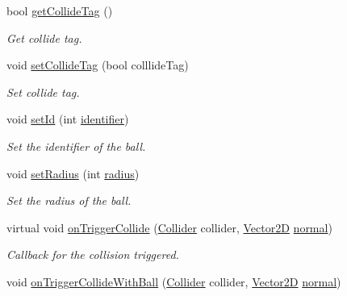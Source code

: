 \begin{DoxyCompactItemize}
\mbox{\label{class_ball_a553ca162341d99cec726faf101ebda15}} 
bool \mbox{\hyperlink{class_ball_a553ca162341d99cec726faf101ebda15}{get\+Collide\+Tag}} ()
\begin{DoxyCompactList}\small\item\em Get collide tag. \end{DoxyCompactList}\item 
\mbox{\label{class_ball_ac632803a5c106b3b0b4c79a1ca090c93}} 
void \mbox{\hyperlink{class_ball_ac632803a5c106b3b0b4c79a1ca090c93}{set\+Collide\+Tag}} (bool colllide\+Tag)
\begin{DoxyCompactList}\small\item\em Set collide tag. \end{DoxyCompactList}\item 
\mbox{\label{class_ball_ac2c10315d996774fc363d30b3fcae373}} 
void \mbox{\hyperlink{class_ball_ac2c10315d996774fc363d30b3fcae373}{set\+Id}} (int \mbox{\hyperlink{class_ball_a0cc36bfd335b414464d66b2f07935943}{identifier}})
\begin{DoxyCompactList}\small\item\em Set the identifier of the ball. \end{DoxyCompactList}\item 
\mbox{\label{class_ball_a02ea7b8dabe3f7e5084c4af4e943d6fe}} 
void \mbox{\hyperlink{class_ball_a02ea7b8dabe3f7e5084c4af4e943d6fe}{set\+Radius}} (int \mbox{\hyperlink{class_ball_a86bfb032007c736e06c2295a8070d620}{radius}})
\begin{DoxyCompactList}\small\item\em Set the radius of the ball. \end{DoxyCompactList}\item 
virtual void \mbox{\hyperlink{class_ball_a3b386c2b504c84e82554a6f502643a2b}{on\+Trigger\+Collide}} (\mbox{\hyperlink{class_collider}{Collider}} collider, \mbox{\hyperlink{struct_vector2_d}{Vector2D}} \mbox{\hyperlink{class_collider_a9326e2676880c40f35832ed2c6d6b073}{normal}})
\begin{DoxyCompactList}\small\item\em Callback for the collision triggered. \end{DoxyCompactList}\item 
void \mbox{\hyperlink{class_ball_a90c9eb2d1cdbcb19bf3864992d755cfd}{on\+Trigger\+Collide\+With\+Ball}} (\mbox{\hyperlink{class_collider}{Collider}} collider, \mbox{\hyperlink{struct_vector2_d}{Vector2D}} \mbox{\hyperlink{class_collider_a9326e2676880c40f35832ed2c6d6b073}{normal}})

\end{DoxyCompactItemize}
